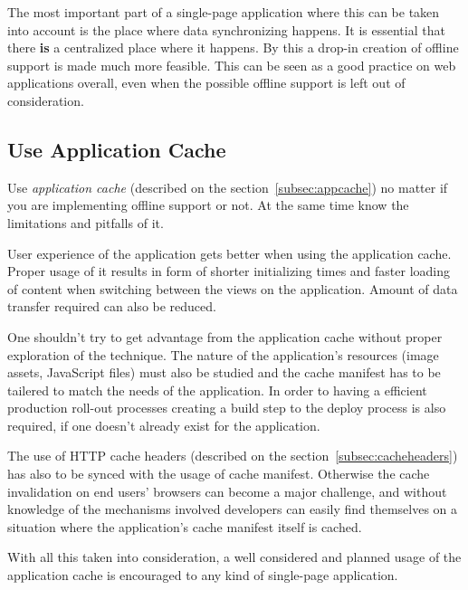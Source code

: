 The most important part of a single-page application where this can be taken into account is the place where data synchronizing happens. It is essential that there \textbf{is} a centralized place where it happens. By this a drop-in creation of offline support is made much more feasible. This can be seen as a good practice on web applications overall, even when the possible offline support is left out of consideration. 






\subsection{Use Application Cache}


Use \textit{application cache} (described on the section~\ref{subsec:appcache}) no matter if you are implementing offline support or not. At the same time know the limitations and pitfalls of it.

User experience of the application gets better when using the application cache. Proper usage of it results in form of shorter initializing times and faster loading of content when switching between the views on the application. Amount of data transfer required can also be reduced. 

One shouldn't try to get advantage from the application cache without proper exploration of the technique. The nature of the application's resources (image assets, JavaScript files) must also be studied and the cache manifest has to be tailered to match the needs of the application. In order to having a efficient production roll-out processes creating a build step to the deploy process is also required, if one doesn't already exist for the application.

The use of HTTP cache headers (described on the section~\ref{subsec:cacheheaders}) has also to be synced with the usage of cache manifest. Otherwise the cache invalidation on end users' browsers can become a major challenge, and without knowledge of the mechanisms involved developers can easily find themselves on a situation where the application's cache manifest itself is cached. 

With all this taken into consideration, a well considered and planned usage of the application cache is encouraged to any kind of single-page application.









